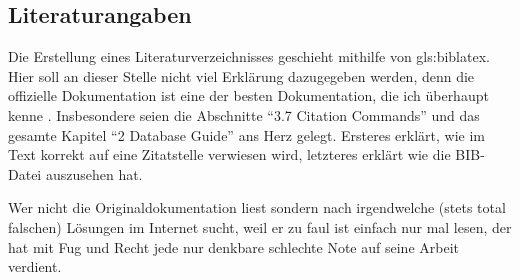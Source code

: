 \subsection{Literaturangaben}%
\label{sec:Literaturangaben}
%
Die Erstellung eines Literaturverzeichnisses geschieht mithilfe von \gls{gls:biblatex}.
Hier soll an dieser Stelle nicht viel Erklärung dazugegeben werden, denn die
offizielle Dokumentation ist eine der besten Dokumentation, die ich überhaupt
kenne \parencite{Lehman2013}. Insbesondere seien die Abschnitte \enquote{3.7
Citation Commands} und das gesamte Kapitel \enquote{2 Database Guide} ans Herz
gelegt. Ersteres erklärt, wie im Text korrekt auf eine Zitatstelle verwiesen
wird, letzteres erklärt wie die BIB-Datei auszusehen hat.

Wer nicht die Originaldokumentation liest sondern nach irgendwelche (stets total
falschen) Lösungen im Internet sucht, weil er zu faul ist einfach nur mal lesen,
der hat mit Fug und Recht jede nur denkbare schlechte Note auf seine Arbeit
verdient.
